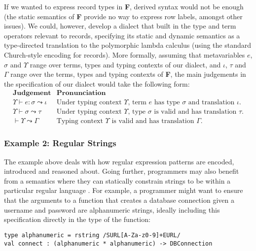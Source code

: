 If we wanted to express record types in \textbf{F}, derived syntax would not be enough (the static semantics of \textbf{F} provide no way to express row labels, amongst other issues). We could, however, develop a dialect that built in the type and term operators relevant to records, specifying its static and dynamic semantics as a type-directed translation to the polymorphic lambda calculus (using the standard Church-style encoding for records). More formally, assuming that metavariables $e$, $\sigma$ and $\Upsilon$ range over terms, types and typing contexts of our dialect, and $\iota$, $\tau$ and $\Gamma$  range over the terms, types and typing contexts of \textbf{F}, the main judgements in the specification of our dialect would take the following form:
\[\begin{array}{ll}
\textbf{Judgement} & \textbf{Pronunciation}\\
\Upsilon \vdash e : \sigma \leadsto \iota & \text{Under typing context $\Upsilon$, term $e$ has type $\sigma$ and translation $\iota$.}\\
\Upsilon \vdash \sigma \leadsto \tau & \text{Under typing context $\Upsilon$, type $\sigma$ is valid and has translation $\tau$.}\\
\vdash \Upsilon \leadsto \Gamma & \text{Typing context $\Upsilon$ is valid and has translation $\Gamma$.}
\end{array}\]


\subsubsection{Example 2: Regular Strings}\label{sec:rstr}
The example above deals with how regular expression patterns are  encoded, introduced and reasoned about. Going further, programmers may also benefit from a semantics where they can statically constrain strings to be within a particular regular language \cite{sanitation-psp14}. For example, a programmer might want to ensure that the arguments to a function that creates a database connection given a username and password are alphanumeric strings, ideally including this specification directly in the type of the  function:
\begin{lstlisting}[numbers=none]
type alphanumeric = rstring /SURL[A-Za-z0-9]+EURL/
val connect : (alphanumeric * alphanumeric) -> DBConnection
\end{lstlisting}

